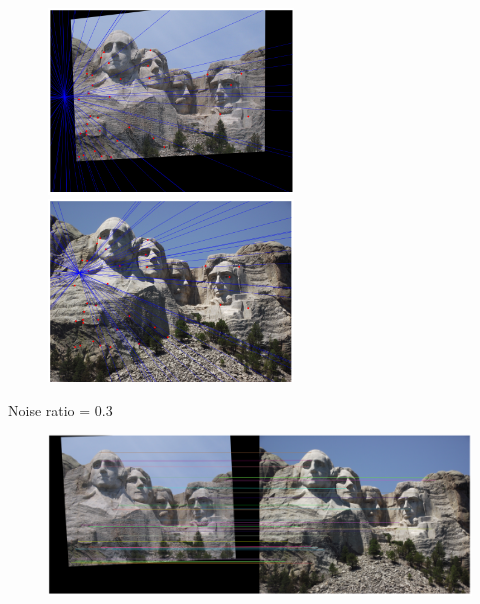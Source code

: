 \documentclass[11pt]{article}
\begin{document}
\begin{figure}[H]
    \centering
    \includegraphics[width=6.5cm]{images/part3/ransac_image_1_noise_0.2_left.png}
    \includegraphics[width=6.5cm]{images/part3/ransac_image_1_noise_0.2_right.png}
\end{figure}

Noise ratio = 0.3
\begin{figure}[H]
    \centering
    \includegraphics[width=14cm]{images/part3/ransac_image_1_noise_0.3_1.png}
\end{figure}
\end{document}
